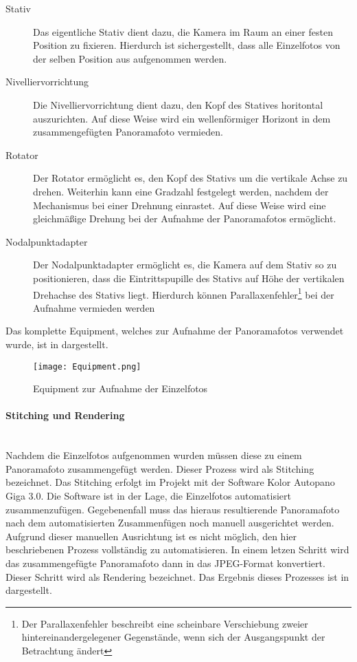 \begin{description}
\item[Stativ] Das eigentliche Stativ dient dazu, die Kamera im Raum an einer
festen Position zu fixieren. Hierdurch ist sichergestellt, dass alle
Einzelfotos von der selben Position aus aufgenommen werden.
\item[Nivelliervorrichtung] Die Nivelliervorrichtung dient dazu, den Kopf des
Statives horitontal auszurichten. Auf diese Weise wird ein wellenförmiger
Horizont in dem zusammengefügten Panoramafoto vermieden.
\item[Rotator] Der Rotator ermöglicht es, den Kopf des Stativs um die vertikale
Achse zu drehen. Weiterhin kann eine Gradzahl festgelegt werden, nachdem der
Mechanismus bei einer Drehnung einrastet. Auf diese Weise wird eine gleichmäßige
Drehung bei der Aufnahme der Panoramafotos ermöglicht.
\item[Nodalpunktadapter] Der Nodalpunktadapter ermöglicht es, die Kamera auf
dem Stativ so zu positionieren, dass die Eintrittspupille des Stativs auf Höhe
der vertikalen Drehachse des Stativs liegt. Hierdurch können
Parallaxenfehler\footnote{Der Parallaxenfehler beschreibt eine scheinbare
Verschiebung zweier hintereinandergelegener Gegenstände, wenn sich der
Ausgangspunkt der Betrachtung ändert} bei der Aufnahme vermieden werden
\end{description}

Das komplette Equipment, welches zur Aufnahme der Panoramafotos verwendet wurde,
ist in  dargestellt.

\begin{figure}[htb]
\centering
\texttt{[image: Equipment.png]}
\caption[Equipment zur Aufnahme der Einzelfotos]{Equipment zur Aufnahme der Einzelfotos\protect\footnotemark}
\label{fig:Equipment}
\end{figure}

\paragraph{Stitching und Rendering} \hfill \\

Nachdem die Einzelfotos aufgenommen wurden müssen diese zu einem Panoramafoto
zusammengefügt werden. Dieser Prozess wird als Stitching bezeichnet. Das
Stitching erfolgt im Projekt mit der Software Kolor Autopano Giga 3.0. Die
Software ist in der Lage, die Einzelfotos automatisiert zusammenzufügen.
Gegebenenfall muss das hieraus resultierende Panoramafoto nach dem
automatisierten Zusammenfügen noch manuell ausgerichtet werden. Aufgrund
dieser manuellen Ausrichtung ist es nicht möglich, den hier beschriebenen
Prozess vollständig zu automatisieren. In einem letzen Schritt wird das
zusammengefügte Panoramafoto dann in das JPEG-Format konvertiert. Dieser Schritt
wird als Rendering bezeichnet. Das Ergebnis dieses Prozesses ist in
 dargestellt.

